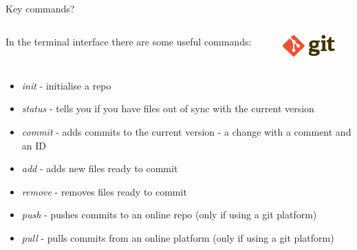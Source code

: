 \documentclass[10pt]{beamer}
\begin{document}
\begin{frame}[fragile]{Key commands?}
\begin{columns}[T]
\begin{column}{.8\textwidth}
In the terminal interface there are some useful commands:
\end{column}
\begin{column}{.2\textwidth}
\includegraphics[width=2cm]{Figs/Git-logo}
\end{column}
\end{columns}
\begin{itemize}
\item \textit{init} - initialise a repo
\item \textit{status} - tells you if you have files out of sync with the current version
\item \textit{commit} - adds commits to the current version - a change with a comment and an ID
\item \textit{add} - adds new files ready to commit
\item \textit{remove} - removes files ready to commit
\item \textit{push} - pushes commits to an online repo (only if using a git platform)
\item \textit{pull} - pulls commits from an online platform (only if using a git platform)
\end{itemize}
\end{frame}
\end{document}
